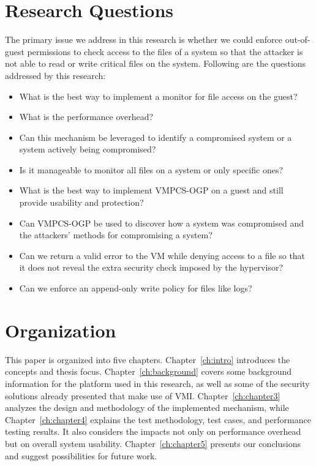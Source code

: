 \section{Research Questions}\label{sec:question}
\par The primary issue we address in this research is whether we could enforce out-of-guest permissions to check access to the files of a system so that the attacker is not able to read or write critical files on the system. Following are the questions addressed by this research:
\begin{itemize}
	\item What is the best way to implement a monitor for file access on the guest?
	\item What is the performance overhead?
	\item Can this mechanism be leveraged to identify a compromised system or a system actively being compromised?
	\item Is it manageable to monitor all files on a system or only specific ones?
	\item What is the best way to implement \ac{VMPCS-OGP} on a guest and still provide usability and protection?
	\item Can \ac{VMPCS-OGP} be used to discover how a system was compromised and the attackers' methods for compromising a system?%
	\item Can we return a valid error to the VM while denying access to a file so that it does not reveal the extra security check imposed by the hypervisor?
	\item Can we enforce an append-only write policy for files like logs?
\end{itemize}

\section{Organization}\label{sec:organization}
This paper is organized into five chapters. Chapter~\ref{ch:intro} introduces the concepts and thesis focus. Chapter~\ref{ch:background} covers some background information for the platform used in this research, as well as some of the security solutions already presented that make use of \ac{VMI}. Chapter~\ref{ch:chapter3} analyzes the design and methodology of the implemented mechanism, while Chapter~\ref{ch:chapter4} explains the test methodology, test cases, and performance testing results. It also considers the impacts not only on performance overhead but on overall system usability. Chapter~\ref{ch:chapter5} presents our conclusions and suggest possibilities for future work.



